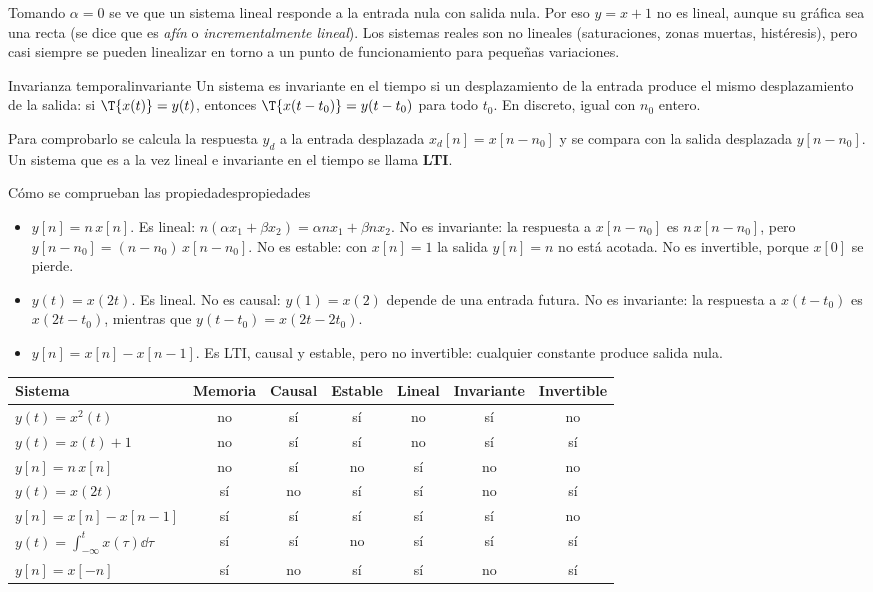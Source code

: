 \documentclass[11pt,a4paper]{scrartcl}
\begin{document}
Tomando $\alpha=0$ se ve que un sistema lineal responde a la entrada nula con salida nula. Por eso $y=x+1$ no es lineal, aunque su gráfica sea una recta (se dice que es \emph{afín} o \emph{incrementalmente lineal}). Los sistemas reales son no lineales (saturaciones, zonas muertas, histéresis), pero casi siempre se pueden linealizar en torno a un punto de funcionamiento para pequeñas variaciones.

\begin{definicion}{Invarianza temporal}{invariante}
  Un sistema es invariante en el tiempo si un desplazamiento de la entrada produce el mismo desplazamiento de la salida: si $\T\{x(t)\}=y(t)$, entonces $\T\{x(t-t_0)\}=y(t-t_0)$ para todo $t_0$. En discreto, igual con $n_0$ entero.
\end{definicion}

Para comprobarlo se calcula la respuesta $y_d$ a la entrada desplazada $x_d[n]=x[n-n_0]$ y se compara con la salida desplazada $y[n-n_0]$. Un sistema que es a la vez lineal e invariante en el tiempo se llama \textbf{LTI}.

\begin{ejemplo}{Cómo se comprueban las propiedades}{propiedades}
  \begin{itemize}
    \item $y[n]=n\,x[n]$. Es lineal: $n(\alpha x_1+\beta x_2)=\alpha nx_1+\beta nx_2$. No es invariante: la respuesta a $x[n-n_0]$ es $n\,x[n-n_0]$, pero $y[n-n_0]=(n-n_0)\,x[n-n_0]$. No es estable: con $x[n]=1$ la salida $y[n]=n$ no está acotada. No es invertible, porque $x[0]$ se pierde.
    \item $y(t)=x(2t)$. Es lineal. No es causal: $y(1)=x(2)$ depende de una entrada futura. No es invariante: la respuesta a $x(t-t_0)$ es $x(2t-t_0)$, mientras que $y(t-t_0)=x(2t-2t_0)$.
    \item $y[n]=x[n]-x[n-1]$. Es LTI, causal y estable, pero no invertible: cualquier constante produce salida nula.
  \end{itemize}
\end{ejemplo}

\begin{center}
  \small
  \renewcommand{\arraystretch}{1.25}
  \begin{tabular}{@{}lcccccc@{}}
    \toprule
    Sistema & Memoria & Causal & Estable & Lineal & Invariante & Invertible\\\midrule
    $y(t)=x^2(t)$ & no & sí & sí & no & sí & no\\
    $y(t)=x(t)+1$ & no & sí & sí & no & sí & sí\\
    $y[n]=n\,x[n]$ & no & sí & no & sí & no & no\\
    $y(t)=x(2t)$ & sí & no & sí & sí & no & sí\\
    $y[n]=x[n]-x[n-1]$ & sí & sí & sí & sí & sí & no\\
    $y(t)=\int_{-\infty}^{t}x(\tau)\dd\tau$ & sí & sí & no & sí & sí & sí\\
    $y[n]=x[-n]$ & sí & no & sí & sí & no & sí\\\bottomrule
  \end{tabular}
\end{center}
\end{document}
